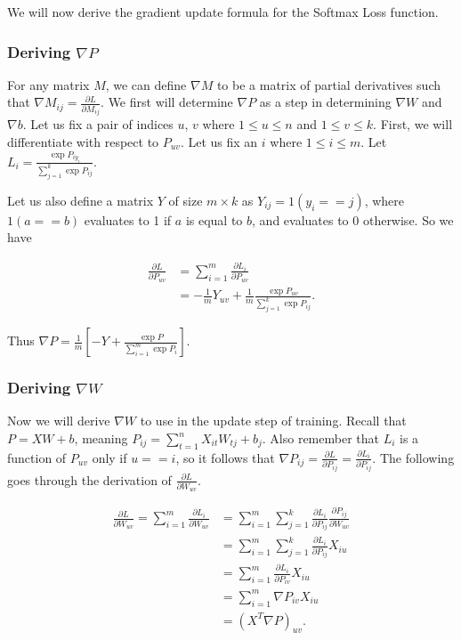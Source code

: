 We will now
derive the gradient update formula for the Softmax Loss function.

\subsubsection{Deriving $\nabla P$}

For any matrix $M$, we can define $\nabla M$ to be a matrix of partial
derivatives such that $\nabla M_{ij} = \frac{\partial L}{\partial M_{ij}}.$
We first will determine $\nabla P$ as a step in determining $\nabla W$ and
$\nabla b$. Let us fix a pair of indices $u$, $v$ where $1 \leq u \leq n$ and
$1 \leq v \leq k$. First, we will differentiate with respect to $P_{uv}$.
Let us fix an $i$ where $1 \leq i \leq m$.  Let $L_i = \frac{\exp{P_{iy_i}}}
{\sum_{j=1}^k \exp{P_{ij}}}$.

Let us also define a matrix $Y$ of size $m \times k$ as $Y_{ij} = 1(y_i == j)$,
where $1(a == b)$ evaluates to 1 if $a$ is equal to $b$, and evaluates to 0
otherwise. So we have 

\begin{align*}
  \frac{\partial L}{\partial P_{uv}}
  &= \sum_{i=1}^m \frac{\partial L_i}{\partial P_{uv}}\\
  &= -\frac{1}{m} Y_{uv} + \frac{1}{m}
  \frac{\exp{P_{uv}}}{\sum_{j=1}^k \exp{P_{ij}}}.
\end{align*}

Thus $\nabla P = \frac{1}{m} \left[ -Y + \frac{\exp{P}}{\sum_{i=1}^m
    \exp{P_i}} \right]$.

\subsubsection{Deriving $\nabla W$}
Now we will derive $\nabla W$ to use in the update step of training. Recall
that $P = XW + b$, meaning $P_{ij} = \sum_{t=1}^n X_{it}W_{tj} + b_j $.
Also remember that $L_i$ is a function of $P_{uv}$ only if $u == i$, so it
follows that $\nabla P_{ij} = \frac{\partial L}{\partial P_{ij}} =
\frac{\partial L_i}{\partial P_{ij}}$. The following goes through the
derivation of $\frac{\partial L}{\partial W_{uv}}$.

\begin{align*} 
     \frac{\partial L}{\partial W_{uv}} = 
     \sum_{i=1}^m \frac{\partial L_i}{\partial W_{uv}} &= 
     \sum_{i=1}^m \sum_{j=1}^k \frac{\partial L_i}{\partial P_{ij}}
       \frac{\partial P_{ij}}{\partial W_{uv}}\\
     &= \sum_{i=1}^m \sum_{j=1}^k
         \frac{\partial L_i}{\partial P_{ij}} X_{iu}\\
     &= \sum_{i=1}^m \frac{\partial L_i}{\partial P_{iv}} X_{iu}\\
     &= \sum_{i=1}^m \nabla P_{iv} X_{iu}\\
     &= \left( X^T \nabla P \right)_{uv}.
\end{align*}

